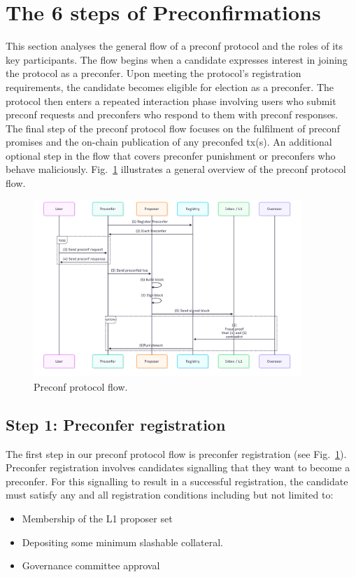 \documentclass[a4paper]{article}
\theoremstyle{boldstyle}
\begin{document}
    



\section{The 6 steps of Preconfirmations}
This section analyses the general flow of a preconf protocol and the roles of its key participants. The flow begins when a candidate expresses interest in joining the protocol as a preconfer. Upon meeting the protocol’s registration requirements, the candidate becomes eligible for election as a preconfer. The protocol then enters a repeated interaction phase involving users who submit preconf requests and preconfers who respond to them with preconf responses. The final step of the preconf protocol flow focuses on the fulfilment of preconf promises and the on-chain publication of any preconfed tx(s). An additional optional step in the flow that covers preconfer punishment or preconfers who behave maliciously. Fig.~\ref{preconf_protocol_flow} illustrates a general overview of the preconf protocol flow.


    \begin{figure}[htbp]
        \centering
        \includegraphics[width=0.9\textwidth]{figures/preconfProtocolFlow.png}
        \caption{Preconf protocol flow.}
        \label{preconf_protocol_flow}
    \end{figure}
    
\subsection{Step 1: Preconfer registration}
\label{step1:preconfer_registration}
    The first step in our preconf protocol flow is preconfer registration (see Fig.~\ref{preconf_protocol_flow}). Preconfer registration involves candidates signalling that they want to become a preconfer. For this signalling to result in a successful registration, the candidate must satisfy any and all registration conditions including but not limited to:
    \begin{itemize}
        \item Membership of the L1 proposer set
        \item Depositing some minimum slashable collateral.
        \item Governance committee approval
    \end{itemize}
\end{document}
